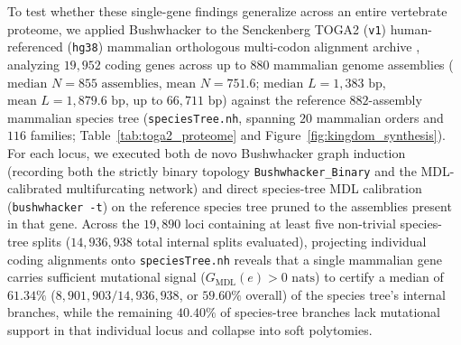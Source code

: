 \documentclass[11pt,a4paper]{article}
\begin{document}
To test whether these single-gene findings generalize across an entire vertebrate proteome, we applied Bushwhacker to the Senckenberg TOGA2 (\texttt{v1}) human-referenced (\texttt{hg38}) mammalian orthologous multi-codon alignment archive \citep{kirilenko2023integrating,malovichko2026toga2}, analyzing $19,952$ coding genes across up to $880$ mammalian genome assemblies ($\text{median } N = 855\text{ assemblies}$, $\text{mean } N = 751.6$; $\text{median } L = 1,383\text{ bp}$, $\text{mean } L = 1,879.6\text{ bp}$, up to $66,711\text{ bp}$) against the reference $882$-assembly mammalian species tree (\texttt{speciesTree.nh}, spanning $20$ mammalian orders and $116$ families; Table~\ref{tab:toga2_proteome} and Figure~\ref{fig:kingdom_synthesis}). For each locus, we executed both de novo Bushwhacker graph induction (recording both the strictly binary topology \texttt{Bushwhacker\_Binary} and the MDL-calibrated multifurcating network) and direct species-tree MDL calibration (\texttt{bushwhacker -t}) on the reference species tree pruned to the assemblies present in that gene. Across the $19,890$ loci containing at least five non-trivial species-tree splits ($14,936,938$ total internal splits evaluated), projecting individual coding alignments onto \texttt{speciesTree.nh} reveals that a single mammalian gene carries sufficient mutational signal ($G_{\text{MDL}}(e) > 0\text{ nats}$) to certify a median of $61.34\%$ ($8,901,903 / 14,936,938$, or $59.60\%$ overall) of the species tree's internal branches, while the remaining $40.40\%$ of species-tree branches lack mutational support in that individual locus and collapse into soft polytomies.
\end{document}
